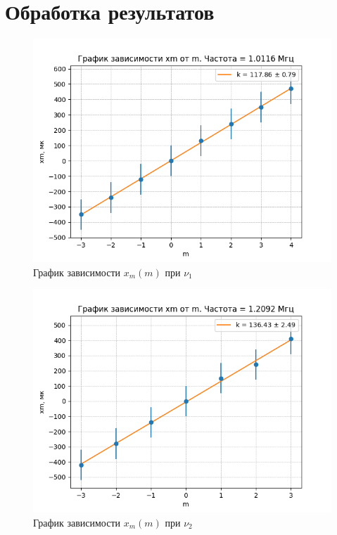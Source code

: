 \documentclass[a4paper,12pt]{article}
\begin{document}
	\section*{Обработка результатов}
	\begin{figure}[h!]
		\centering	
		\includegraphics[width=1\textwidth]{1.png}
		\caption{График зависимости $x_{m}(m)$ при $\nu_{1}$}
		\label{diff}
	\end{figure}
	\begin{figure}[h!]
		\centering	
		\includegraphics[width=1\textwidth]{2.png}
		\caption{График зависимости $x_{m}(m)$ при $\nu_{2}$}
		\label{diff}
	\end{figure}
\end{document}

